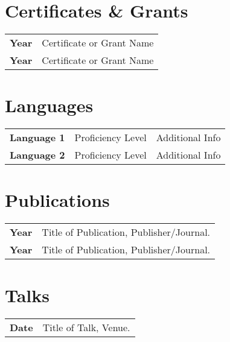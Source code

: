 \documentclass[lighthipster]{CV}
\begin{document}
\begin{paracol}{2}
        \begin{minipage}[t]{0.3\textwidth}
            \section*{Certificates \& Grants}
            \begin{tabular}{>{\footnotesize\bfseries}r >{\footnotesize}p{}}
                Year & Certificate or Grant Name \\
                Year & Certificate or Grant Name
            \end{tabular}
            \bigskip

            \section*{Languages}
            \begin{tabular}{l | ll}
                \textbf{Language 1} & Proficiency Level & Additional Info \\
                \textbf{Language 2} & Proficiency Level & Additional Info
            \end{tabular}
            \bigskip

        \end{minipage}\hfill
        \begin{minipage}[t]{0.3\textwidth}
            \section*{Publications}
            \begin{tabular}{>{\footnotesize\bfseries}r >{\footnotesize}p{}}
                Year & Title of Publication, Publisher/Journal. \\
                Year & Title of Publication, Publisher/Journal.
            \end{tabular}
            \bigskip

            \section*{Talks}
            \begin{tabular}{>{\footnotesize\bfseries}r >{\footnotesize}p{}}
                Date & Title of Talk, Venue.
            \end{tabular}
        \end{minipage}

        \vfill{} %


\end{paracol}
\end{document}
